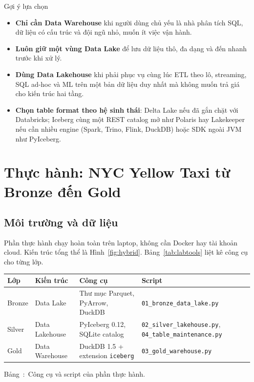\documentclass[12pt]{article}
\newenvironment{figblock}{\par\medskip\noindent\begin{minipage}{\linewidth}}{\end{minipage}\par\medskip}
\newcounter{bang}
\newcommand{\tabcap}[2]{%
  \begin{captionbelowboxaivn}\refstepcounter{bang}Bảng~\thebang:~#1\label{#2}\end{captionbelowboxaivn}}
\begin{document}
\begin{guidelinebox}{Gợi ý lựa chọn}
\begin{itemize}
    \item \textbf{Chỉ cần Data Warehouse} khi người dùng chủ yếu là nhà phân tích SQL, dữ liệu có cấu trúc và đội ngũ nhỏ, muốn ít việc vận hành.
    \item \textbf{Luôn giữ một vùng Data Lake} để lưu dữ liệu thô, đa dạng và đến nhanh trước khi xử lý.
    \item \textbf{Dùng Data Lakehouse} khi phải phục vụ cùng lúc ETL theo lô, streaming, SQL ad-hoc và ML trên một bản dữ liệu duy nhất mà không muốn trả giá cho kiến trúc hai tầng.
    \item \textbf{Chọn table format theo hệ sinh thái}: Delta Lake nếu đã gắn chặt với Databricks; Iceberg cùng một REST catalog mở như Polaris hay Lakekeeper nếu cần nhiều engine (Spark, Trino, Flink, DuckDB) hoặc SDK ngoài JVM như PyIceberg.
\end{itemize}
\end{guidelinebox}

\section{Thực hành: NYC Yellow Taxi từ Bronze đến Gold}
\label{sec:lab}

\subsection{Môi trường và dữ liệu}

Phần thực hành chạy hoàn toàn trên laptop, không cần Docker hay tài khoản cloud. Kiến trúc tổng thể là Hình~\ref{fig:hybrid}. Bảng~\ref{tab:labtools} liệt kê công cụ cho từng lớp.

\begin{figblock}\begin{center}
\renewcommand{\arraystretch}{1.3}
\small
\begin{tabularx}{\linewidth}{|P{1.5cm}|P{2.7cm}|L|P{5.4cm}|}
\hline
{}
\textbf{Lớp} & \textbf{Kiến trúc} & \textbf{Công cụ} & \textbf{Script} \\
\hline
Bronze & Data Lake & Thư mục Parquet, PyArrow, DuckDB & \texttt{01\_bronze\_data\_lake.py} \\
\hline
Silver & Data Lakehouse & PyIceberg 0.12, SQLite catalog & \texttt{02\_silver\_lakehouse.py}, \texttt{04\_table\_maintenance.py} \\
\hline
Gold & Data Warehouse & DuckDB 1.5 + extension \texttt{iceberg} & \texttt{03\_gold\_warehouse.py} \\
\hline
\end{tabularx}
\end{center}
\tabcap{Công cụ và script của phần thực hành.}{tab:labtools}
\end{figblock}
\end{document}

